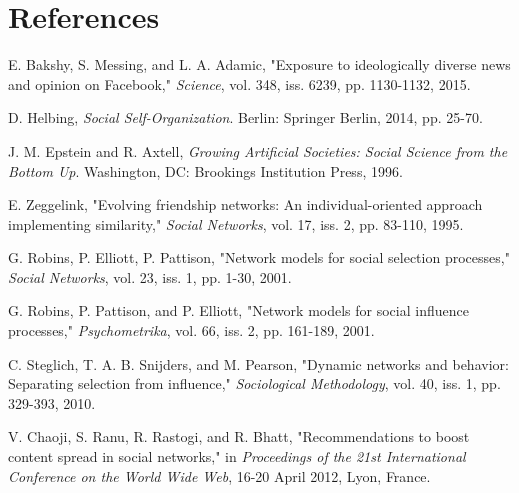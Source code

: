 \documentclass[12pt,letterpaper]{article}
\begin{document}
\section{References}
\begin{thebibliography}{}

 E. Bakshy, S. Messing, and L. A. Adamic, "Exposure to ideologically diverse news and opinion on Facebook," \textit{Science}, vol. 348, iss. 6239, pp. 1130-1132, 2015.

 D. Helbing, \textit{Social Self-Organization}. Berlin: Springer Berlin, 2014, pp. 25-70.

 J. M. Epstein and R. Axtell, \textit{Growing Artificial Societies: Social Science from the Bottom Up}. Washington, DC: Brookings Institution Press, 1996.

 E. Zeggelink, "Evolving friendship networks: An individual-oriented approach implementing similarity," \textit{Social Networks}, vol. 17, iss. 2, pp. 83-110, 1995.

 G. Robins, P. Elliott, P. Pattison, "Network models for social selection processes," \textit{Social Networks}, vol. 23, iss. 1, pp. 1-30, 2001.

 G. Robins, P. Pattison, and P. Elliott, "Network models for social influence processes," \textit{Psychometrika}, vol. 66, iss. 2, pp. 161-189, 2001.

 C. Steglich, T. A. B. Snijders, and M. Pearson, "Dynamic networks and behavior: Separating selection from influence," \textit{Sociological Methodology}, vol. 40, iss. 1, pp. 329-393, 2010.

 V. Chaoji, S. Ranu, R. Rastogi, and R. Bhatt, "Recommendations to boost content spread in social networks," in \textit{Proceedings of the 21st International Conference on the World Wide Web}, 16-20 April 2012, Lyon, France.










\end{thebibliography}
\end{document}
